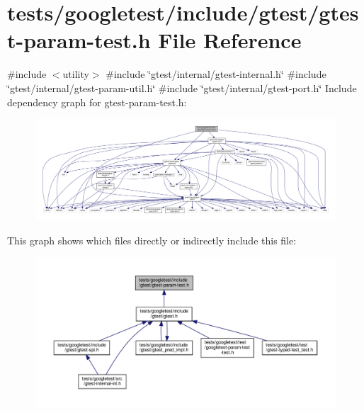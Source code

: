 \hypertarget{gtest-param-test_8h}{}\section{tests/googletest/include/gtest/gtest-\/param-\/test.h File Reference}
\label{gtest-param-test_8h}
{\ttfamily \#include $<$utility$>$}\newline
{\ttfamily \#include \char`\"{}gtest/internal/gtest-\/internal.\+h\char`\"{}}\newline
{\ttfamily \#include \char`\"{}gtest/internal/gtest-\/param-\/util.\+h\char`\"{}}\newline
{\ttfamily \#include \char`\"{}gtest/internal/gtest-\/port.\+h\char`\"{}}\newline
Include dependency graph for gtest-\/param-\/test.h\+:\nopagebreak
\begin{figure}[H]
\begin{center}
\leavevmode
\includegraphics[width=350pt]{gtest-param-test_8h__incl}
\end{center}
\end{figure}
This graph shows which files directly or indirectly include this file\+:\nopagebreak
\begin{figure}[H]
\begin{center}
\leavevmode
\includegraphics[width=350pt]{gtest-param-test_8h__dep__incl}
\end{center}
\end{figure}
